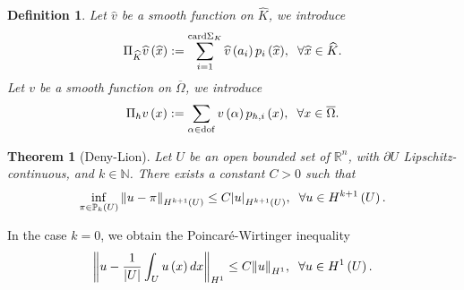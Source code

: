 \documentclass[11pt,a4paper,center,notitlepage]{article}
\numberwithin{equation}{section}
\newtheorem{definition}{Definition}[section]
\newtheorem{theorem}{Theorem}[section]
\begin{document}
\begin{definition}
Let $\widehat{v}$ be a smooth function on $\widehat{K}$, we introduce
\begin{align}
{\Pi _{\widehat K}}\widehat v\left( {\widehat x} \right): = \sum\limits_{i = 1}^{{\rm card }{\Sigma _K}} {\widehat v\left( {{a_i}} \right){p_i}\left( {\widehat x} \right)} ,\hspace{2mm} \forall \widehat{x}\in \widehat{K}.
\end{align}
Let $v$ be a smooth function on $\overline{\Omega}$, we introduce
\begin{align}
{\Pi _h}v\left( x \right): = \sum\limits_{\alpha  \in {\rm dof}} {v\left( \alpha  \right){p_{h,i}}\left( x \right)} ,\hspace{2mm}\forall x \in \overline \Omega  .
\end{align}
\end{definition}

\begin{theorem}[Deny-Lion]
Let $U$ be an open bounded set of $\mathbb{R}^n$, with $\partial U$ Lipschitz-continuous, and $k\in \mathbb{N}$. There exists a constant $C>0$ such that
\begin{align}
\mathop {\inf }\limits_{\pi  \in {\mathbb{P}_k}\left( U \right)} {\left\| {u - \pi } \right\|_{{H^{k + 1}}\left( U \right)}} \le C{\left| u \right|_{{H^{k + 1}}\left( U \right)}},\hspace{2mm}\forall u \in {H^{k + 1}}\left( U \right).
\end{align}
\end{theorem}
In the case $k=0$, we obtain the Poincar\'e-Wirtinger inequality
\begin{align}
{\left\| {u - \frac{1}{{\left| U \right|}}\int_U {u\left( x \right)dx} } \right\|_{{H^1}}} \le C{\left\| u \right\|_{{H^1}}}, \hspace{2mm} \forall u\in H^1\left(U\right).
\end{align}
\end{document}
